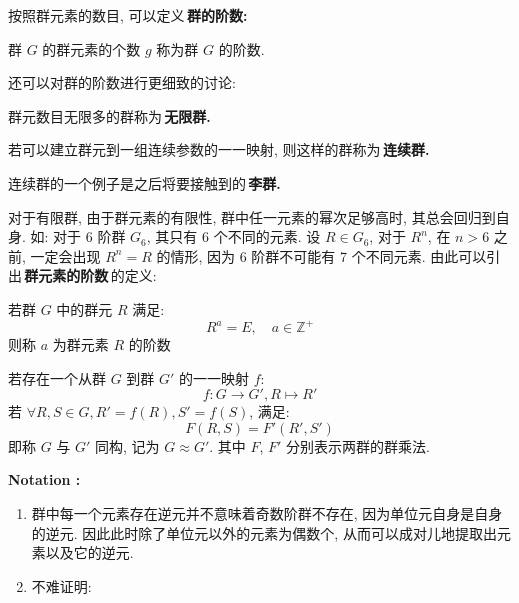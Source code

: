         \hspace*{2em}按照群元素的数目, 可以定义\,\textbf{群的阶数:}\,

            \begin{Definition}[群的阶数]
                群 $G$ 的群元素的个数 $g$ 称为群 $G$ 的阶数.
            \end{Definition}

        \hspace*{2em}还可以对群的阶数进行更细致的讨论:

            \begin{Concept}[无限群]
                群元数目无限多的群称为\,\textbf{无限群.}\,
            \end{Concept}

            \begin{Concept}[连续群]
                若可以建立群元到一组连续参数的一一映射, 则这样的群称为\,\textbf{连续群.}\,
            \end{Concept}
            连续群的一个例子是之后将要接触到的\,\textbf{李群.}\,

        \hspace*{2em}对于有限群, 由于群元素的有限性, 群中任一元素的幂次足够高时, 其总会回归到自身. 如: 对于 6 阶群 $G_{6}$, 其只有 6 个不同的元素. 设 $R \in G_{6}$, 对于 $R^n$, 在 $n > 6$ 之前, 一定会出现 $R^n = R$ 的情形, 因为 6 阶群不可能有 7 个不同元素. 由此可以引出\,\textbf{群元素的阶数}\,的定义:

            \begin{Definition}[群元素的阶数]
                若群 $G$ 中的群元 $R$ 满足:
                    \begin{equation}
                        R^{a} = E, \quad a \in \mathbb{Z}^{+}
                    \end{equation}
                则称 $a$ 为群元素 $R$ 的阶数
            \end{Definition}

        \begin{Definition}[群的同构]
            若存在一个从群 $G$ 到群 $G'$ 的一一映射 $f$:
                \begin{equation}
                    f: G \to G', R \mapsto R'
                \end{equation}
            若 $\forall R, S \in G, R' = f(R), S' = f(S)$, 满足:
                \begin{equation}
                    F(R, S) = F'(R', S')
                \end{equation}
            即称 $G$ 与 $G'$ 同构, 记为 $G \approx G'$. 其中 $F$, $F'$ 分别表示两群的群乘法.
        \end{Definition}

        \textbf{Notation :}
        \begin{enumerate}
            \item 群中每一个元素存在逆元并不意味着奇数阶群不存在, 因为单位元自身是自身的逆元. 因此此时除了单位元以外的元素为偶数个, 从而可以成对儿地提取出元素以及它的逆元.
            \item 不难证明: 
        \end{enumerate}
